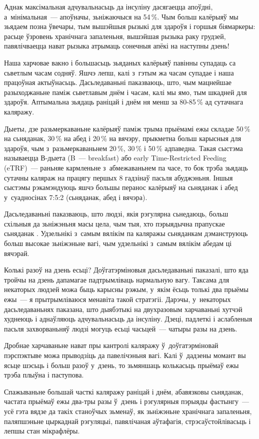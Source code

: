 Аднак максімальная адчувальнасьць да інсуліну дасягаецца апоўдні, а~мінімальная~--- апоўначы, зьніжаючыся на 54\,\%. Чым больш калёрыяў мы зьядаем позна ўвечары, тым вышэйшыя рызыкі для здароўя і горшыя біямаркеры: расьце ўзровень хранічнага запаленьня, вышэйшая рызыка раку грудзей, павялічваецца нават рызыка атрымаць сонечныя апёкі на наступны дзень!

Наша харчовае вакно і большасьць зьяданых калёрыяў павінны супадаць са сьветлым часам содняў. Яшчэ лепш, калі з~гэтым жа часам супадае і наша працоўная актыўнасьць. Дасьледаваньні паказваюць, што, чым мацнейшае разыходжаньне паміж сьветлавым днём і часам, калі мы ямо, тым шкадней для здароўя. Аптымальна зьядаць раніцай і днём ня менш за 80-85\,\% ад сутачнага каляражу.

Дыеты, дзе разьмеркаваньне калёрыяў паміж трыма прыёмамі ежы складае 50\,\% на сьняданак, 30\,\% на абед і 20\,\% на вячэру, прыкметна больш карысныя для здароўя, чым з~разьмеркаваньнем 20\,\%, 30\,\% і 50\,\% адпаведна. Такая сыстэма называецца В-дыета (B~--- breakfast) або early Time-Restricted Feeding (eTRF)~--- раньняе кармленьне з~абмежаваньнем па часе, то бок трэба зьядаць сутачны каляраж на працягу першых 8 гадзінаў пасьля абуджэньня. Іншыя сыстэмы рэкамэндуюць яшчэ большы перанос калёрыяў на сьняданак і абед у~суадносінах 7:5:2 (сьняданак, абед і вячэра).

Дасьледаваньні паказваюць, што людзі, якія рэгулярна сьнедаюць, больш схільныя да зьніжэньня масы цела, чым тыя, хто пэрыядычна прапускае сьняданак . Удзельнікі з~самым вялікім па каляражы сьняданкам дэманструюць больш высокае зьніжэньне вагі, чым удзельнікі з~самым вялікім абедам ці вячэрай.

Колькі разоў на дзень есьці? Доўгатэрміновыя дасьледаваньні паказалі, што яда тройчы на дзень дапамагае падтрымліваць нармальную вагу. Таксама для некаторых людзей можа быць карысны рэжым, у~якім ёсьць толькі два прыёмы ежы~--- я прытрымліваюся менавіта такой стратэгіі. Дарэчы, у~некаторых дасьледаваньнях паказана, што дыябэтыкі на двухразовым харчаваньні хутчэй худнеюць і аднаўляюць адчувальнасьць да інсуліну. Дзеці, падлеткі і аслабленыя пасьля захворваньняў людзі могуць есьці часьцей~--- чатыры разы на дзень.

Дробнае харчаваньне нават пры кантролі каляражу ў~доўгатэрміновай пэрспэктыве можа прыводзіць да павелічэньня вагі. Калі ў~дадзены момант вы ясьце шэсьць і больш разоў у~дзень, то зьмяншаць колькасьць прыёмаў ежы трэба плыўна і паступова.

Спажываньне большай часткі каляражу раніцай і днём, абавязковы сьняданак, частата прыёмаў ежы два-тры разы ў~дзень і рэгулярныя пэрыяды фастынгу~--- усё гэта вядзе да такіх станоўчых зьменаў, як зьніжэньне хранічнага запаленьня, паляпшэньне цыркаднай рэгуляцыі, павялічаная аўтафагія, стрэсаўстойлівасьць і лепшы стан мікрафлёры.

